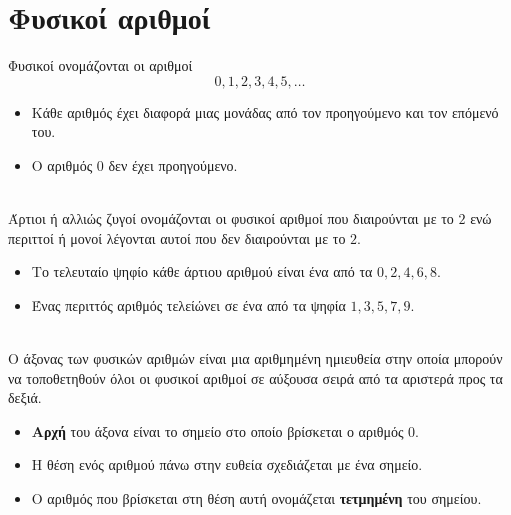 \chapter{Φυσικοί αριθμοί}
\tignwrizw
{}
Φυσικοί ονομάζονται οι αριθμοί
\[ 0,1,2,3,4,5,\ldots \]
\begin{itemize}
\item Κάθε αριθμός έχει διαφορά μιας μονάδας από τον προηγούμενο και τον επόμενό του.
\item Ο αριθμός $ 0 $ δεν έχει προηγούμενο.
\end{itemize}
\mbox{}\\
Άρτιοι ή αλλιώς ζυγοί ονομάζονται οι φυσικοί αριθμοί που διαιρούνται με το $ 2 $ ενώ περιττοί ή μονοί λέγονται αυτοί που δεν διαιρούνται με το $ 2 $. 
\begin{itemize}
\item Το τελευταίο ψηφίο κάθε άρτιου αριθμού είναι ένα από τα $ 0,2,4,6,8 $. 
\item Ένας περιττός αριθμός τελείώνει σε ένα από τα ψηφία $ 1,3,5,7,9 $.
\end{itemize}
\mbox{}\\
Ο άξονας των φυσικών αριθμών είναι μια αριθμημένη ημιευθεία στην οποία μπορούν να τοποθετηθούν όλοι οι φυσικοί αριθμοί σε αύξουσα σειρά από τα αριστερά προς τα δεξιά.
\begin{center}
\end{center}
\begin{itemize}[itemsep=0mm]
\item \textbf{Αρχή} του άξονα είναι το σημείο στο οποίο βρίσκεται ο αριθμός $ 0 $.
\item Η θέση ενός αριθμού πάνω στην ευθεία σχεδιάζεται με ένα σημείο.
\item Ο αριθμός που βρίσκεται στη θέση αυτή ονομάζεται \textbf{τετμημένη} του σημείου.
\end{itemize}


